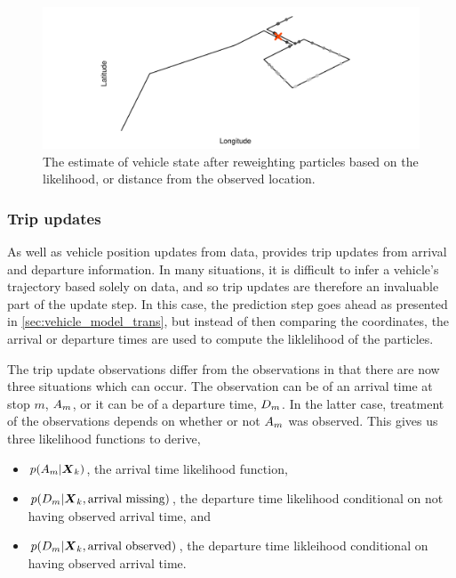 \begin{knitrout}
\color{fgcolor}\begin{figure}

{\centering \includegraphics[width=\maxwidth]{figure/pf_wts-1} 

}

\caption[The \pf{} estimate of vehicle state after reweighting particles based on the likelihood, or distance from the observed location]{The \pf{} estimate of vehicle state after reweighting particles based on the likelihood, or distance from the observed location.}\label{fig:pf_wts}
\end{figure}


\end{knitrout}


\subsubsection{Trip updates}
\label{sec:lhood_trip}

As well as vehicle position updates from \GPS{} data, \GTFS{} provides trip updates from arrival and departure information. In many situations, it is difficult to infer a vehicle's trajectory based solely on \GPS{} data, and so trip updates are therefore an invaluable part of the update step. In this case, the \pf{} prediction step goes ahead as presented in \cref{sec:vehicle_model_trans}, but instead of then comparing the coordinates, the arrival or departure times are used to compute the liklelihood of the particles.


The trip update observations differ from the \GPS{} observations in that there are now three situations which can occur. The observation can be of an arrival time at stop $m$, $A_m$, or it can be of a departure time, $D_m$. In the latter case, treatment of the observations depends on whether or not $A_m$ was observed. This gives us three likelihood functions to derive,
\begin{itemize}
\item $p(A_m | \boldsymbol{X}_k)$, the arrival time likelihood function,
\item $p(D_m | \boldsymbol{X}_k, \text{arrival missing})$, the departure time likelihood conditional
    on not having observed arrival time, and
\item $p(D_m | \boldsymbol{X}_k, \text{arrival observed})$, the departure time likleihood conditional
    on having observed arrival time.
\end{itemize}


